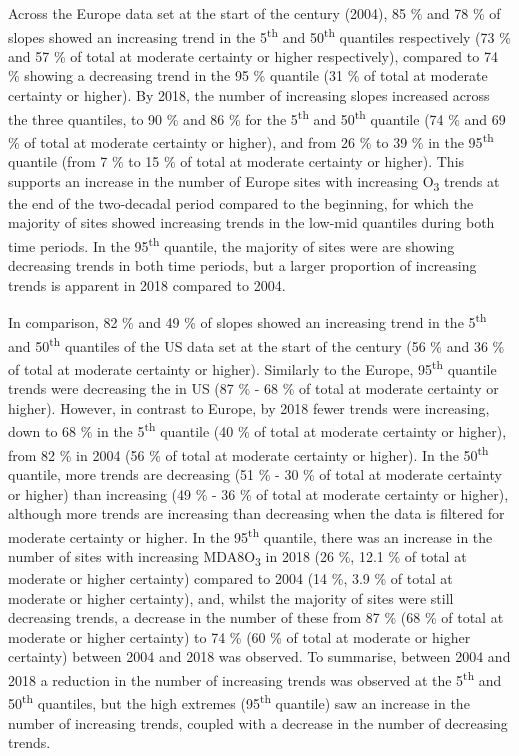 \documentclass[journal abbreviation, manuscript]{copernicus}
\begin{document}
Across the Europe data set at the start of the century (2004), 85 \% and 78 \% of slopes showed an increasing trend in the 5\textsuperscript{th} and 50\textsuperscript{th} quantiles respectively (73 \% and 57 \% of total at moderate certainty or higher respectively), compared to 74 \% showing a decreasing trend in the 95 \% quantile (31 \% of total at moderate certainty or higher). By 2018, the number of increasing slopes increased across the three quantiles, to 90 \% and 86 \% for the 5\textsuperscript{th} and 50\textsuperscript{th} quantile (74 \% and 69 \% of total at moderate certainty or higher), and from 26 \% to 39 \% in the 95\textsuperscript{th} quantile (from 7 \% to 15 \% of total at moderate certainty or higher). This supports an increase in the number of Europe sites with increasing O\textsubscript{3} trends at the end of the two-decadal period compared to the beginning, for which the majority of sites showed increasing trends in the low-mid quantiles during both time periods. In the 95\textsuperscript{th} quantile, the majority of sites were are showing decreasing trends in both time periods, but a larger proportion of increasing trends is apparent in 2018 compared to 2004. 

In comparison, 82 \%  and 49 \% of slopes showed an increasing trend in the 5\textsuperscript{th} and 50\textsuperscript{th} quantiles of the US data set at the start of the century (56 \% and 36 \% of total at moderate certainty or higher). Similarly to the Europe, 95\textsuperscript{th} quantile trends were decreasing the in US (87 \% - 68 \% of total at moderate certainty or higher). However, in contrast to Europe, by 2018 fewer trends were increasing, down to 68 \% in the 5\textsuperscript{th} quantile (40 \% of total at moderate certainty or higher), from 82 \% in 2004 (56 \% of total at moderate certainty or higher). In the 50\textsuperscript{th} quantile, more trends are decreasing (51 \% - 30 \% of total at moderate certainty or higher) than increasing (49 \% - 36 \% of total at moderate certainty or higher), although more trends are increasing than decreasing when the data is filtered for moderate certainty or higher. In the 95\textsuperscript{th} quantile, there was an increase in the number of sites with increasing MDA8O\textsubscript{3} in 2018 (26 \%, 12.1 \% of total at moderate or higher certainty) compared to 2004 (14 \%, 3.9 \% of total at moderate or higher certainty), and, whilst the majority of sites were still decreasing trends, a decrease in the number of these from 87 \% (68 \% of total at moderate or higher certainty) to 74 \% (60 \% of total at moderate or higher certainty) between 2004 and 2018 was observed. To summarise, between 2004 and 2018 a reduction in the number of increasing trends was observed at the 5\textsuperscript{th} and 50\textsuperscript{th} quantiles, but the high extremes (95\textsuperscript{th} quantile) saw an increase in the number of increasing trends, coupled with a decrease in the number of decreasing trends.
\end{document}
